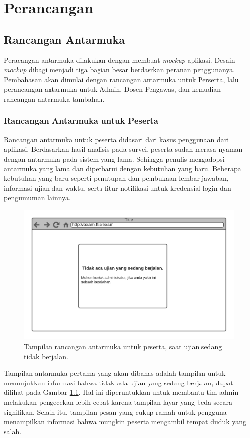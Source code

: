 \chapter{Perancangan}
\label{chap:perancangan}

\section{Rancangan Antarmuka}
    Peracangan antarmuka dilakukan dengan membuat \textit{mockup} aplikasi. Desain \textit{mockup} dibagi 
    menjadi tiga bagian besar berdasrkan peranan penggunanya. Pembahasan akan dimulai dengan rancangan 
    antarmuka untuk Perserta, lalu perancangan antarmuka untuk Admin, Dosen Pengawas, dan kemudian rancangan 
    antarmuka tambahan.

\subsection{Rancangan Antarmuka untuk Peserta}
    Rancangan antarmuka untuk peserta didasari dari kasus penggunaan dari aplikasi. Berdasarkan hasil analisis
    pada survei, peserta sudah merasa nyaman dengan antarmuka pada sistem yang lama. Sehingga penulis
    mengadopsi antarmuka yang lama dan diperbarui dengan kebutuhan yang baru. Beberapa kebutuhan yang baru
    seperti penutupan dan pembukaan lembar jawaban, informasi ujian dan waktu, serta fitur notifikasi untuk
    kredensial login dan pengumuman lainnya.
    
    \begin{figure}[H]
        \centering
        \includegraphics[width=0.7\paperwidth]{Gambar/mockups/Mockup--Peserta - Blankstate.pdf}
        \caption{Tampilan rancangan antarmuka untuk peserta, saat ujian sedang tidak berjalan.}
        \label{fig:mockup_peserta_blankstate}
    \end{figure}
     Tampilan antarmuka pertama yang akan dibahas adalah tampilan untuk menunjukkan informasi bahwa
     tidak ada ujian yang sedang berjalan, dapat dilihat pada Gambar \ref{fig:mockup_peserta_blankstate}. 
     Hal ini diperuntukkan
     untuk membantu tim admin melakukan pengecekan lebih cepat karena tampilan layar yang beda secara
     signifikan. Selain itu, tampilan pesan yang cukup ramah untuk pengguna menampilkan 
     informasi bahwa mungkin peserta mengambil tempat duduk yang salah.

